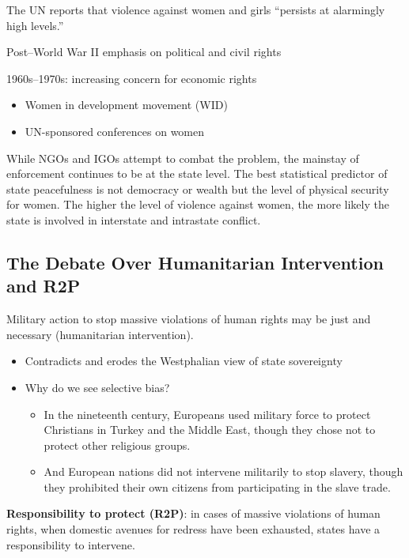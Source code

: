 \documentclass[
]{book}
\begin{document}
The UN reports that violence against women and girls ``persists at alarmingly high levels.''

Post--World War II emphasis on political and civil rights

1960s--1970s: increasing concern for economic rights

\begin{itemize}
\item
  Women in development movement (WID)
\item
  UN-sponsored conferences on women
\end{itemize}

While NGOs and IGOs attempt to combat the problem, the mainstay of enforcement continues to be at the state level. The best statistical predictor of state peacefulness is not democracy or wealth but the level of physical security for women. The higher the level of violence against women, the more likely the state is involved in interstate and intrastate conflict.

\hypertarget{the-debate-over-humanitarian-intervention-and-r2p}{%
\subsection{The Debate Over Humanitarian Intervention and R2P}\label{the-debate-over-humanitarian-intervention-and-r2p}}

Military action to stop massive violations of human rights may be just and necessary (humanitarian intervention).

\begin{itemize}
\item
  Contradicts and erodes the Westphalian view of state sovereignty
\item
  Why do we see selective bias?

  \begin{itemize}
  \item
    In the nineteenth century, Europeans used military force to protect Christians in Turkey and the Middle East, though they chose not to protect other religious groups.
  \item
    And European nations did not intervene militarily to stop slavery, though they prohibited their own citizens from participating in the slave trade.
  \end{itemize}
\end{itemize}

\textbf{Responsibility to protect (R2P)}: in cases of massive violations of human rights, when domestic avenues for redress have been exhausted, states have a responsibility to intervene.
\end{document}
